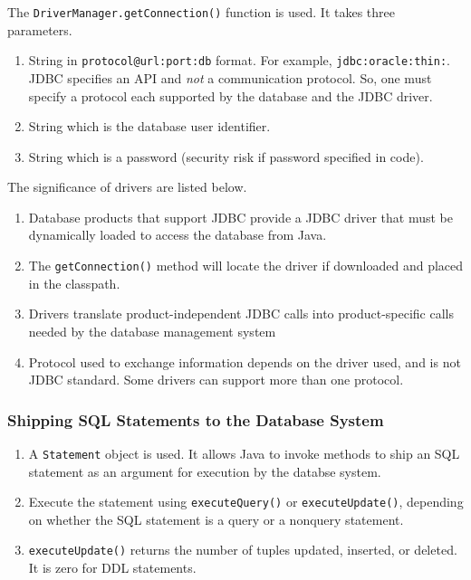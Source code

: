 \documentclass[journal,12pt,twocolumn]{IEEEtran}
\begin{document}
The \texttt{DriverManager.getConnection()} function is used. It takes three 
parameters.
\begin{enumerate}
     \item String in \texttt{protocol@url:port:db} format. For example,
     \texttt{jdbc:oracle:thin:}. JDBC specifies an API and \textit{not} a 
     communication protocol. So, one must specify a protocol each supported by 
     the database and the JDBC driver.
     \item String which is the database user identifier.
     \item String which is a password (security risk if password specified in code).
\end{enumerate}
The significance of drivers are listed below.
\begin{enumerate}
     \item Database products that support JDBC provide a JDBC driver that must
     be dynamically loaded to access the database from Java.
     \item The \texttt{getConnection()} method will locate the driver if
     downloaded and placed in the classpath.
     \item Drivers translate product-independent JDBC calls into product-specific
     calls needed by the database management system
     \item Protocol used to exchange information depends on the driver used, and
     is not JDBC standard. Some drivers can support more than one protocol.
\end{enumerate}

\subsubsection{Shipping SQL Statements to the Database System}\hfill

\begin{enumerate}
     \item A \texttt{Statement} object is used. It allows Java to invoke
     methods to ship an SQL statement as an argument for execution by the
     databse system.
     \item Execute the statement using \texttt{executeQuery()} or 
     \texttt{executeUpdate()}, depending on whether the SQL statement is a
     query or a nonquery statement.
     \item \texttt{executeUpdate()} returns the number of tuples updated,
     inserted, or deleted. It is zero for DDL statements.
\end{enumerate}
\end{document}
